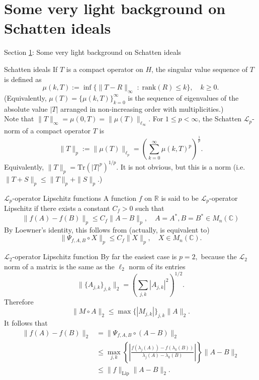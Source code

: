 \documentclass{beamer}
\numberwithin{equation}{section}
\theoremstyle{plain}
\theoremstyle{plain}
\theoremstyle{definition}
\theoremstyle{plain}
\theoremstyle{plain}
\theoremstyle{definition}
\newcommand{\Rl}{\mathbb{R}}
\newcommand{\Cplx}{\mathbb{C}}
\newcommand{\Lc}{\mathcal{L}}
\newcommand{\Tr}{\mathrm{Tr}}
\begin{document}
\section{Some very light background on Schatten ideals}\label{section_schatten}

\begin{frame}
    \Huge{Section \ref{section_schatten}: Some very light background on Schatten ideals}
\end{frame}



\begin{frame}{Schatten ideals}
    If $T$ is a compact operator on $H$, the singular value sequence of $T$ is defined as
    $$
        \mu(k,T) := \inf\{\|T-R\|_{\infty}\;:\;\mathrm{rank}(R)\leq k\},\quad k\geq 0.
    $$
    (Equivalently, $\mu(T) = \{\mu(k,T)\}_{k=0}^\infty$ is the sequence of eigenvalues of the absolute value $|T|$ arranged in non-increasing order with multiplicities.)\\
    \pause
    Note that $\|T\|_\infty = \mu(0,T) = \|\mu(T)\|_{\ell_\infty}.$
    \pause
    For $1\leq p < \infty$, the Schatten $\Lc_p$-norm of a compact operator $T$ is
    $$
        \|T\|_p := \|\mu(T)\|_{\ell_p} = \left(\sum_{k=0}^\infty \mu(k,T)^p\right)^{\frac1p}.
    $$
    Equivalently, $\|T\|_p = \Tr(|T|^p)^{1/p}.$
    It is not obvious, but this is a norm (i.e. $\|T+S\|_p\leq \|T\|_p+\|S\|_p.$)
\end{frame}

\begin{frame}{$\Lc_p$-operator Lipschitz functions}
    A function $f$ on $\Rl$ is said to be $\Lc_p$-operator Lipschitz if there exists a constant $C_f>0$ such that
    $$
        \|f(A)-f(B)\|_p \leq C_f\|A-B\|_p,\quad A=A^*,B=B^* \in M_n(\Cplx)
    $$
    By Loewner's identity, this follows from (actually, is equivalent to)
    \[
        \|\Psi_{f,A,B}\circ X\|_p \leq C_f\|X\|_p,\quad X\in M_n(\Cplx).
    \]
\end{frame}

\begin{frame}{$\Lc_2$-operator Lipschitz function}
    By far the easiest case is $p=2,$ because the $\Lc_2$ norm of a matrix is the same as the $\ell_2$ norm of its entries
    \[
        \|\{A_{j,k}\}_{j,k}\|_2 = \left(\sum_{j,k} |A_{j,k}|^2\right)^{1/2}.
    \]
    Therefore
    \[
        \|M\circ A\|_{2} \leq \max\{|M_{j,k}|\}_{j,k} \|A\|_2.
    \]
    It follows that
    \begin{align*}
        \|f(A)-f(B)\|_2 &= \|\Psi_{f,A,B}\circ (A-B)\|_2\\
                        &\leq \max_{j,k} \left\{\left|\frac{f(\lambda_j(A))-f(\lambda_k(B))}{\lambda_j(A)-\lambda_k(B)}\right|\right\}\|A-B\|_2\\
                        &\leq\|f\|_{\mathrm{Lip}}\|A-B\|_2.
    \end{align*}
\end{frame}
\end{document}

